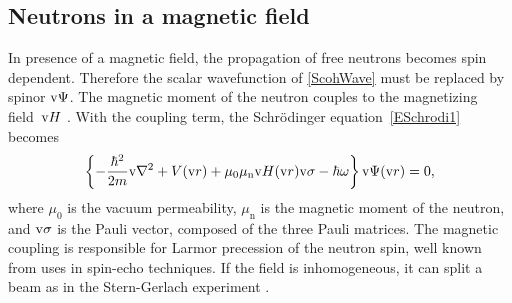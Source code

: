 \subsection{Neutrons in a magnetic field}\label{Snpwave}

%
%
%

%
%
%

In presence of a magnetic field,
the propagation of free neutrons becomes spin dependent.
Therefore the scalar wavefunction of \cref{ScohWave}
must be replaced by spinor $\text{v}\Psi$.
%
The magnetic moment of the neutron couples to the magnetizing field~$\text{v}{H}$ \cite{Mez86}.
%
%
With the coupling term, the Schrödinger equation~\cref{ESchrodi1}
%
becomes
\begin{equation}\label{EHSchrodi}
  \left\{-\frac{\hbar^2}{2m}\text{v}{\nabla}^2+V(\text{v}{r})
         +\mu_0\mu_\text{n}\text{v}{H}(\text{v}{r})\text{v}{\sigma}-\hbar\omega\right\}
      \text{v}\Psi(\text{v}{r}) = 0,
\end{equation}
%
where $\mu_0$ is the vacuum permeability,
%
%
%
$\mu_\text{n}$ is the magnetic moment of the neutron,
%
%
and ${\text{v}\sigma}$ is the Pauli vector, composed of the three Pauli matrices.
%
%
%
The magnetic coupling is responsible for Larmor precession of the neutron spin,
%
%
%
well known from uses in spin-echo techniques.
%
If the field is inhomogeneous,
it can split a beam
as in the Stern-Gerlach experiment \cite{ShSB54}.
%

